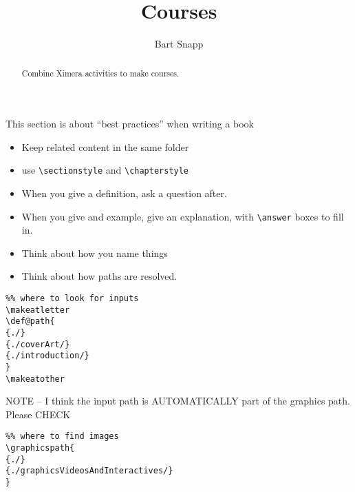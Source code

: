 \documentclass{ximera}
\title{Courses}
\author{Bart Snapp}
\begin{document}
\begin{abstract}
    Combine Ximera activities to make courses.
\end{abstract}
\maketitle

This section is about ``best practices'' when writing a book
\begin{itemize}
    \item Keep related content in the same folder
    \item use \texttt{\textbackslash sectionstyle} and
          \texttt{\textbackslash chapterstyle}
    \item When you give a definition, ask a question after.
    \item When you give and example, give an explanation, with
          \texttt{\textbackslash answer} boxes to fill in.
    \item Think about how you name things
    \item Think about how paths are resolved.
\end{itemize}

\begin{example}
    \begin{verbatim} 
%% where to look for inputs
\makeatletter
\def@path{
{./}
{./coverArt/}
{./introduction/}
}
\makeatother   
\end{verbatim}
\end{example}

NOTE -- I think the input path is AUTOMATICALLY part of the graphics path.
Please CHECK
\begin{example}
    \begin{verbatim}
%% where to find images
\graphicspath{  
{./}
{./graphicsVideosAndInteractives/}
}    
\end{verbatim}
\end{example}
\end{document}
